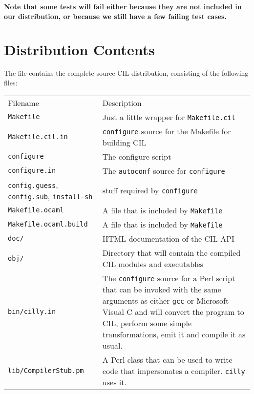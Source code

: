 \documentclass{article}
\def\t#1{{\tt #1}}
\begin{document}
 {\bf Note that some tests will fail either because they are not included in
 our distribution, or because we still have a few failing test cases.}

  \section{Distribution Contents}

The file  
contains the complete source CIL distribution, 
consisting of the following files:

\begin{tabular}{ll}
Filename   & Description \\
\t{Makefile}                    & Just a little wrapper for \t{Makefile.cil} \\
\t{Makefile.cil.in}              & \t{configure} source for the 
                                  Makefile for building CIL \\
\t{configure}                   & The configure script \\
\t{configure.in}                & The \t{autoconf} source for \t{configure} \\
\t{config.guess}, \t{config.sub}, \t{install-sh} & stuff required by
                                \t{configure} \\
\t{Makefile.ocaml}              & A file that is included by \t{Makefile} \\
\t{Makefile.ocaml.build}        & A file that is included by \t{Makefile} \\
\t{doc/}                        & HTML documentation of the CIL API \\
\t{obj/}                        & Directory that will contain the compiled
                                   CIL modules and executables\\
\t{bin/cilly.in}                & The \t{configure} source for a Perl script 
                                  that can be invoked with the 
                                  same arguments as either \t{gcc} or
                                  Microsoft Visual C and will convert the
                                  program to CIL, perform some simple
                                  transformations, emit it and compile it as
                                  usual. \\
\t{lib/CompilerStub.pm}         & A Perl class that can be used to write code
                                  that impersonates a compiler. \t{cilly}
                                  uses it.  \\

\end{tabular}
\end{document}
